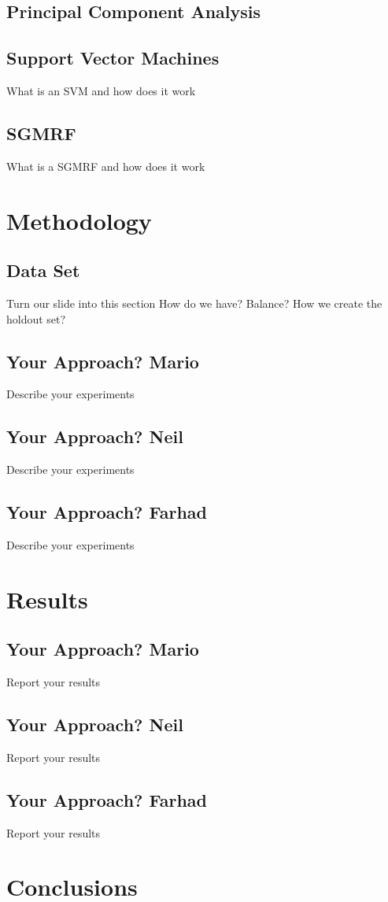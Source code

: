 \documentclass{article} %
\begin{document}
\subsection{Principal Component Analysis}

\subsection{Support Vector Machines}
What is an SVM and how does it work

\subsection{SGMRF}
What is a SGMRF and how does it work


\section{Methodology}

\subsection{Data Set}
Turn our slide into this section
How do we have? Balance? 
How we create the holdout set?


\subsection{Your Approach? Mario}
Describe your experiments

\subsection{Your Approach? Neil}
Describe your experiments

\subsection{Your Approach? Farhad}
Describe your experiments

\section{Results}

\subsection{Your Approach? Mario}
Report your results

\subsection{Your Approach? Neil}
Report your results

\subsection{Your Approach? Farhad}
Report your results

\section{Conclusions}





	
\end{document}
